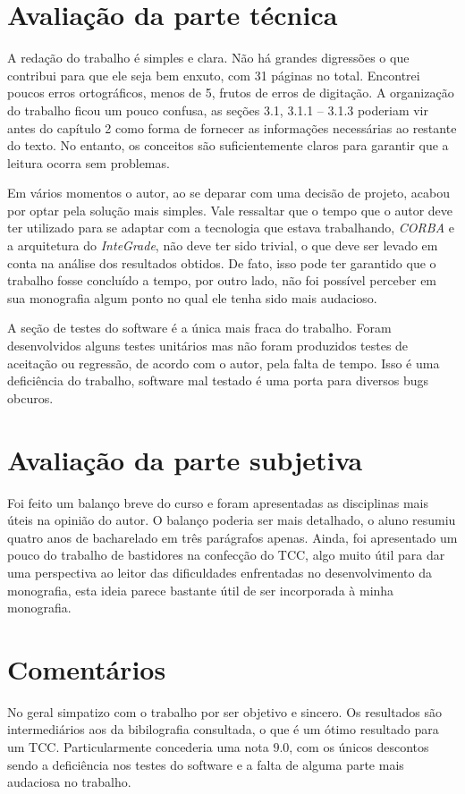 \documentclass{article}
\begin{document}
\section{Avaliação da parte técnica}
	A redação do trabalho é simples e clara. Não há grandes digressões o que contribui para que ele seja bem enxuto, com 31 páginas no total. Encontrei poucos erros ortográficos, menos de 5, frutos de erros de digitação. A organização do trabalho ficou um pouco confusa, as seções 3.1, 3.1.1 -- 3.1.3 poderiam vir antes do capítulo 2 como forma de fornecer as informações necessárias ao restante do texto. No entanto, os conceitos são suficientemente claros para garantir que a leitura ocorra sem problemas.

	Em vários momentos o autor, ao se deparar com uma decisão de projeto, acabou por optar pela solução mais simples. Vale ressaltar que o tempo que o autor deve ter utilizado para se adaptar com a tecnologia que estava trabalhando, \emph{CORBA} e a arquitetura do \emph{InteGrade}, não deve ter sido trivial, o que deve ser levado em conta na análise dos resultados obtidos. De fato, isso pode ter garantido que o trabalho fosse concluído a tempo, por outro lado, não foi possível perceber em sua monografia algum ponto no qual ele tenha sido mais audacioso. 
	
	A seção de testes do software é a única mais fraca do trabalho. Foram desenvolvidos alguns testes unitários mas não foram produzidos testes de aceitação ou regressão, de acordo com o autor, pela falta de tempo. Isso é uma deficiência do trabalho, software mal testado é uma porta para diversos bugs obcuros.
	
\section{Avaliação da parte subjetiva}
	Foi feito um balanço breve do curso e foram apresentadas as disciplinas mais úteis na opinião do autor. O balanço poderia ser mais detalhado, o aluno resumiu quatro anos de bacharelado em três parágrafos apenas. Ainda, foi apresentado um pouco do trabalho de bastidores na confecção do TCC, algo muito útil para dar uma perspectiva ao leitor das dificuldades enfrentadas no desenvolvimento da monografia, esta ideia parece bastante útil de ser incorporada à minha monografia. 
	
\section{Comentários}
	No geral simpatizo com o trabalho por ser objetivo e sincero. Os resultados são intermediários aos da bibilografia consultada, o que é um ótimo resultado para um TCC. Particularmente concederia uma nota $9.0$, com os únicos descontos sendo a deficiência nos testes do software e a falta de alguma parte mais audaciosa no trabalho.


%
%
\end{document}

